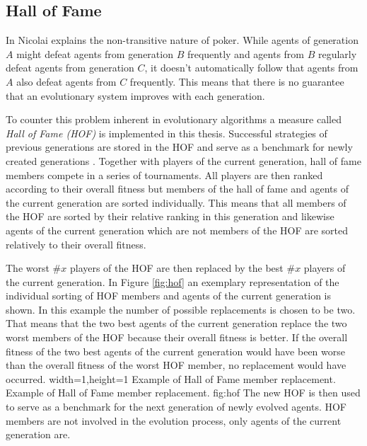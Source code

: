 \subsection{Hall of Fame}
\label{subsec:hof}
In \cite[p. 63]{evolutionary_methods} Nicolai explains the non-transitive nature of poker. While agents of generation $A$ might defeat agents from generation $B$ frequently and agents from $B$ regularly defeat agents from generation $C$, it doesn't automatically follow that agents from $A$ also defeat agents from $C$ frequently. This means that there is no guarantee that an evolutionary system improves with each generation. \par
To counter this problem inherent in evolutionary algorithms a measure called \textit{Hall of Fame (HOF)} is implemented in this thesis. Successful strategies of previous generations are stored in the HOF and serve as a benchmark for newly created generations \cite{evolutionary_methods}. Together with players of the current generation, hall of fame members compete in a series of tournaments. All players are then ranked according to their overall fitness but members of the hall of fame and agents of the current generation are sorted individually. This means that all members of the HOF are sorted by their relative ranking in this generation and likewise agents of the current generation which are not members of the HOF are sorted relatively to their overall fitness. \par
The worst $\#x$ players of the HOF are then replaced by the best $\#x$ players of the current generation.
In Figure \ref{fig:hof} an exemplary representation of the individual sorting of HOF members and agents of the current generation is shown. In this example the number of possible replacements is chosen to be two. That means that the two best agents of the current generation replace the two worst members of the HOF because their overall fitness is better. If the overall fitness of the two best agents of the current generation would have been worse than the overall fitness of the worst HOF member, no replacement would have occurred.
  {width=1\textwidth,height=1\textheight}%
  {Example of Hall of Fame member replacement.}%
  {Example of Hall of Fame member replacement.}%
  {fig:hof}%
  The new HOF is then used to serve as a benchmark for the next generation of newly evolved agents.
 HOF members are not involved in the evolution process, only agents of the current generation are.
\pagebreak

